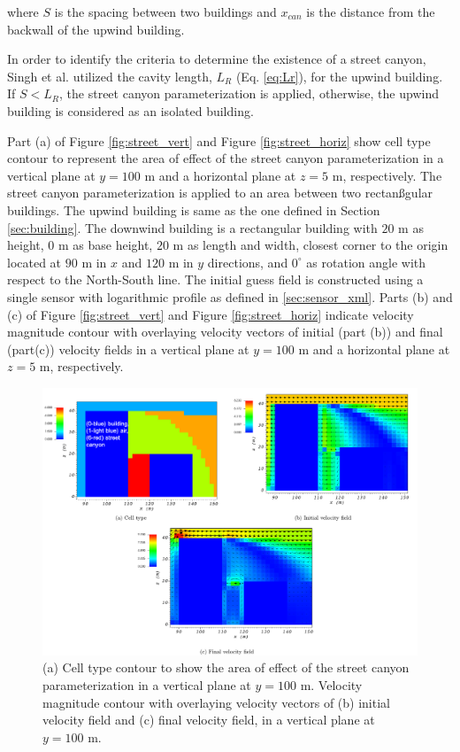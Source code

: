 where $S$ is the spacing between two buildings and $x_{can}$ is the distance from the backwall of the upwind building.

In order to identify the criteria to determine the existence of a street canyon, Singh et al. \cite{singh2008evaluation} utilized the cavity length, $L_R$ (Eq. \ref{eq:Lr}), for the upwind building. If $S < L_R$, the street canyon parameterization is applied, otherwise, the upwind building is considered as an isolated building.

Part (a) of Figure \ref{fig:street_vert} and Figure \ref{fig:street_horiz} show cell type contour to represent the area of effect of the street canyon parameterization in a vertical plane at $y=100$ m and a horizontal plane at $z=5$ m, respectively. The street canyon parameterization is applied to an area between two rectanßgular buildings. The upwind building is same as the one defined in Section \ref{sec:building}. The downwind building is a rectangular building with $20$ m as height, $0$ m as base height, $20$ m as length and width, closest corner to the origin located at $90$ m in $x$ and $120$ m in $y$ directions, and $0^{\circ}$ as rotation angle with respect to the North-South line. The initial guess field is constructed using a single sensor with logarithmic profile as defined in \ref{sec:sensor_xml}. Parts (b) and (c) of Figure \ref{fig:street_vert} and Figure \ref{fig:street_horiz} indicate velocity magnitude contour with overlaying velocity vectors of initial (part (b)) and final (part(c)) velocity fields in a vertical plane at $y=100$ m and a horizontal plane at $z=5$ m, respectively.

\begin{figure}[H]
    \centering
    \includegraphics[width=\textwidth]{Images/street_y_100_1.pdf}
    \caption{(a) Cell type contour to show the area of effect of the street canyon parameterization in a vertical plane at $y=100$ m. Velocity magnitude contour with overlaying velocity vectors of (b) initial velocity field and (c) final velocity field, in a vertical plane at $y=100$ m.}
\end{figure}

